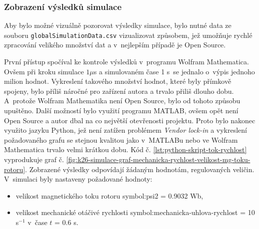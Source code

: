 \documentclass[a4paper, twoside, 11pt]{article}
\begin{document}
			\subsubsection{Zobrazení výsledků simulace}\label{subsubsec:zobrazeni-vysledku-simulace}
			Aby bylo možné vizuálně pozorovat výsledky simulace, bylo nutné data ze souboru \texttt{globalSimulationData.csv} vizualizovat způsobem, jež umožňuje rychlé zpracování velikého množství dat a v~nejlepším případě je Open Source.\par
			První přístup spočíval ke kontrole výsledků v~programu Wolfram Mathematica. Ovšem při kroku simulace $1 \mu$s a simulovaném čase 1 s~se jednalo o~výpis jednoho milion hodnot. Vykreslení takového množství hodnot, které byly přímkově spojeny, bylo příliš náročné pro zařízení autora a trvalo přiliš dlouho dobu. A~protože Wolfram Mathematika není Open Source, bylo od tohoto způsobu upuštěno. Další možností bylo využití programu MATLAB, ovšem opět není Open Source a autor dbal na co největší otevřenosti projektu. Proto bylo nakonec využito jazyku Python, jež není zatížen problémem \textit{Vendor lock-in} a vykreslení požadovaného grafu se stejnou kvalitou jako v~MATLABu nebo ve Wolfram Mathematica trvalo velmi krátkou dobu. Kód č. \ref{lst:python-skript-tok-rychlost} vyprodukuje graf č. \ref{fig:k26-simulace-graf-mechanicka-rychlost-velikost-mg-toku-rotoru}. Zobrazené výsledky odpovídají žádaným hodnotám, regulovaných veličin. V~simulaci byly nastaveny požadované hodnoty:
			\begin{itemize}
				\item velikost magnetického toku rotoru \gls{symbol:psi2} = 0.9032 Wb,
				\item velikost mechanické otáčivé rychlosti \gls{symbol:mechanicka-uhlova-rychlost} = 10 s$^{-1}$ v~čase $t$ = 0.6 s.
			\end{itemize}
\end{document}

